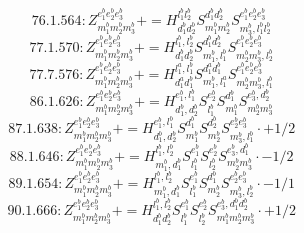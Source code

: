\documentclass[letterpaper,10pt,fleqn,leqno,onecolumn]{article}
\begin{document}
\begin{equation} \;\;\;\;\;\;  76.1.564: Z^{e_{1}^{b}e_{2}^{b}e_{3}^{b}}_{m_{1}^{b}m_{2}^{b}m_{3}^{b}}+=H^{l_{1}^{b}l_{2}^{b}}_{d_{1}^{b}d_{2}^{b}}S^{d_{1}^{b}d_{2}^{b}}_{m_{1}^{b}m_{2}^{b}}S^{e_{1}^{b}e_{2}^{b}e_{3}^{b}}_{m_{3}^{b},l_{1}^{b}l_{2}^{b}} \end{equation}
\begin{equation} \;\;\;\;\;\;  77.1.570: Z^{e_{1}^{b}e_{2}^{b}e_{3}^{b}}_{m_{1}^{b}m_{2}^{b}m_{3}^{b}}+=H^{l_{1}^{b},l_{2}^{b}}_{d_{1}^{b}d_{2}^{b}}S^{d_{1}^{b}d_{2}^{b}}_{m_{1}^{b},l_{1}^{b}}S^{e_{1}^{b}e_{2}^{b}e_{3}^{b}}_{m_{2}^{b}m_{3}^{b},l_{2}^{b}} \end{equation}
\begin{equation} \;\;\;\;\;\;  77.7.576: Z^{e_{1}^{b}e_{2}^{b}e_{3}^{b}}_{m_{1}^{b}m_{2}^{b}m_{3}^{b}}+=H^{l_{1}^{a},l_{1}^{b}}_{d_{1}^{a}d_{1}^{b}}S^{d_{1}^{a}d_{1}^{b}}_{m_{1}^{b},l_{1}^{a}}S^{e_{1}^{b}e_{2}^{b}e_{3}^{b}}_{m_{2}^{b}m_{3}^{b},l_{1}^{b}} \end{equation}
\begin{equation} \;\;\;\;\;\;  86.1.626: Z^{e_{1}^{b}e_{2}^{b}e_{3}^{b}}_{m_{1}^{b}m_{2}^{b}m_{3}^{b}}+=H^{e_{1}^{b},l_{1}^{b}}_{d_{1}^{b},d_{2}^{b}}S^{e_{2}^{b}}_{l_{1}^{b}}S^{d_{1}^{b}}_{m_{1}^{b}}S^{e_{3}^{b},d_{2}^{b}}_{m_{2}^{b}m_{3}^{b}} \end{equation}
\begin{equation} \;\;\;\;\;\;  87.1.638: Z^{e_{1}^{b}e_{2}^{b}e_{3}^{b}}_{m_{1}^{b}m_{2}^{b}m_{3}^{b}}+=H^{e_{1}^{b},l_{1}^{b}}_{d_{1}^{b},d_{2}^{b}}S^{d_{1}^{b}}_{m_{1}^{b}}S^{d_{2}^{b}}_{m_{2}^{b}}S^{e_{2}^{b}e_{3}^{b}}_{m_{3}^{b},l_{1}^{b}}\cdot +1/2 \end{equation}
\begin{equation} \;\;\;\;\;\;  88.1.646: Z^{e_{1}^{b}e_{2}^{b}e_{3}^{b}}_{m_{1}^{b}m_{2}^{b}m_{3}^{b}}+=H^{l_{1}^{b},l_{2}^{b}}_{m_{1}^{b},d_{1}^{b}}S^{e_{1}^{b}}_{l_{1}^{b}}S^{e_{2}^{b}}_{l_{2}^{b}}S^{e_{3}^{b},d_{1}^{b}}_{m_{2}^{b}m_{3}^{b}}\cdot -1/2 \end{equation}
\begin{equation} \;\;\;\;\;\;  89.1.654: Z^{e_{1}^{b}e_{2}^{b}e_{3}^{b}}_{m_{1}^{b}m_{2}^{b}m_{3}^{b}}+=H^{l_{1}^{b},l_{2}^{b}}_{m_{1}^{b},d_{1}^{b}}S^{e_{1}^{b}}_{l_{1}^{b}}S^{d_{1}^{b}}_{m_{2}^{b}}S^{e_{2}^{b}e_{3}^{b}}_{m_{3}^{b},l_{2}^{b}}\cdot -1/1 \end{equation}
\begin{equation} \;\;\;\;\;\;  90.1.666: Z^{e_{1}^{b}e_{2}^{b}e_{3}^{b}}_{m_{1}^{b}m_{2}^{b}m_{3}^{b}}+=H^{l_{1}^{b},l_{2}^{b}}_{d_{1}^{b}d_{2}^{b}}S^{e_{1}^{b}}_{l_{1}^{b}}S^{e_{2}^{b}}_{l_{2}^{b}}S^{e_{3}^{b},d_{1}^{b}d_{2}^{b}}_{m_{1}^{b}m_{2}^{b}m_{3}^{b}}\cdot +1/2 \end{equation}
\end{document}
